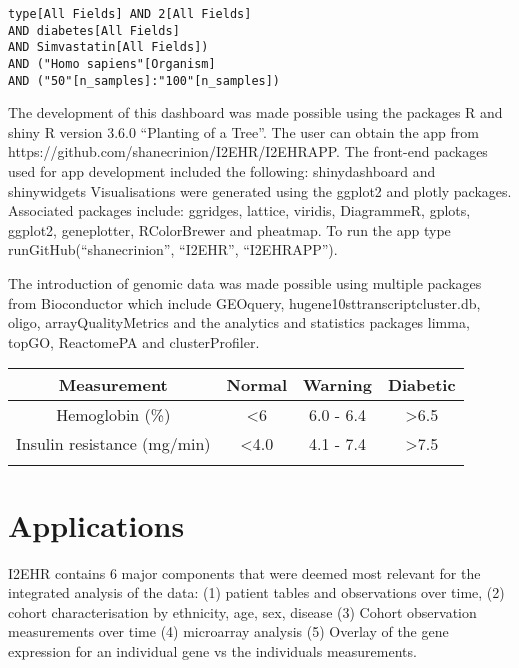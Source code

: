 \documentclass{bioinfo}
\begin{document}
\begin{verbatim}
type[All Fields] AND 2[All Fields]
AND diabetes[All Fields]
AND Simvastatin[All Fields])
AND ("Homo sapiens"[Organism]
AND ("50"[n_samples]:"100"[n_samples])
\end{verbatim}


The development of this dashboard was made possible using the packages R and shiny 
R version 3.6.0 “Planting of a Tree”. The user can obtain the app from https://github.com/shanecrinion/I2EHR/I2EHR\textunderscore APP. The front-end packages used for app development included the following: shinydashboard and shinywidgets Visualisations were generated using the ggplot2 and plotly packages. Associated packages include: ggridges, lattice, viridis, DiagrammeR, gplots, ggplot2, geneplotter, RColorBrewer and pheatmap. To run the app type runGitHub(“shanecrinion”, “I2EHR”, “I2EHR\textunderscore APP”). 

The introduction of genomic data was made possible using multiple packages from Bioconductor which include GEOquery, hugene10sttranscriptcluster.db, oligo, arrayQualityMetrics and the analytics and statistics packages limma, topGO, ReactomePA and clusterProfiler. 

       
\begin{table}[]
\begin{tabular}{@{}cccc@{}}
\toprule
\textbf{Measurement}        & \textbf{Normal}      & \textbf{Warning}     & \textbf{Diabetic}    \\ \midrule
Hemoglobin (\%)             & \textless 6          & 6.0 - 6.4            & \textgreater 6.5     \\
Insulin resistance (mg/min) & \textless 4.0        & 4.1 - 7.4            & \textgreater 7.5     \\
\multicolumn{1}{l}{}        & \multicolumn{1}{l}{} & \multicolumn{1}{l}{} & \multicolumn{1}{l}{}
\end{tabular}
\end{table}


\section{Applications}
I2EHR contains 6 major components that were deemed most relevant for the integrated analysis of the data: (1) patient tables and observations over time, (2) cohort characterisation by ethnicity, age, sex, disease (3) Cohort observation measurements over time (4) microarray analysis (5) Overlay of the gene expression for an individual gene vs the individuals measurements. 
\end{document}
